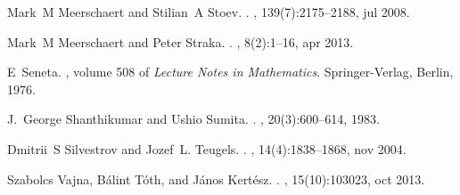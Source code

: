 \documentclass[12pt]{article}
\newcommand{\1}{\mathbf 1}
\begin{document}
\begin{thebibliography}{KKBK12}
Mark~M Meerschaert and Stilian~A Stoev.
.
, 139(7):2175--2188, jul 2008.

Mark~M Meerschaert and Peter Straka.
.
, 8(2):1--16, apr 2013.

E~Seneta.
, volume 508 of {\em Lecture Notes
  in Mathematics}.
\newblock Springer-Verlag, Berlin, 1976.

J.~George Shanthikumar and Ushio Sumita.
.
, 20(3):600--614, 1983.

Dmitrii~S Silvestrov and Jozef~L. Teugels.
.
, 14(4):1838--1868, nov 2004.

Szabolcs Vajna, B{\'{a}}lint T{\'{o}}th, and J{\'{a}}nos Kert{\'{e}}sz.
.
, 15(10):103023, oct 2013.

\end{thebibliography}
\end{document}
